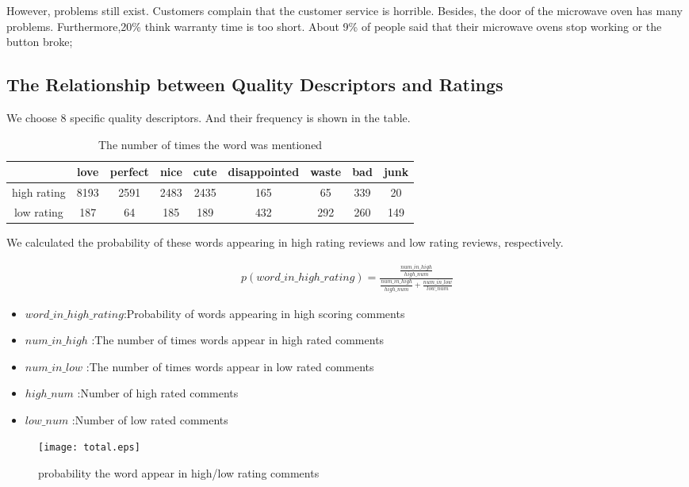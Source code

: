 \documentclass{mcmthesis}
\begin{document}
	However, problems still exist. Customers complain that the customer service is horrible. Besides, the door of the microwave oven has many problems. Furthermore,20\% think warranty time is too short. About 9\% of people said that their microwave ovens stop working or the button broke;
	
	
	
	\subsection{The Relationship between Quality Descriptors and Ratings}
	We choose 8 specific quality descriptors. And their frequency is shown in the table.
	\begin{table}[H]
		\centering
		\caption{The number of times the word was mentioned}
		\begin{tabular}{|c|c|c|c|c|c|c|c|c|}
			\hline 
			& love & perfect & nice & cute & disappointed & waste & bad & junk \\ 
			\hline 
			high rating & 8193 & 2591 & 2483 & 2435 & 165 & 65 & 339 & 20 \\ 
			\hline 
			low rating & 187 & 64 & 185 & 189 & 432 & 292 & 260 & 149 \\ 
			\hline 
		\end{tabular}
	\end{table}
	
	We calculated the probability of these words appearing in high rating reviews and low rating reviews, respectively.
	
	\begin{align}
	p(word\_in\_high\_rating)=\frac{\frac{num\_in\_high}{high\_num}}
	{\frac{num\_in\_high}{high\_num}+\frac{num\_in\_low}{low\_num}}
	\end{align}
	
	\begin{itemize}
		\item  $word\_in\_high\_rating$:Probability of words appearing in high scoring comments 
		\item	$num\_in\_high$ :The number of times words appear in high rated comments
		\item $num\_in\_low$ :The number of times words appear in low rated comments
		\item $high\_num$ :Number of high rated comments
		\item $low\_num$ :Number of low rated comments
	\end{itemize}
	
	
	\begin{figure}[H]
		\begin{minipage}[t]{1\textwidth}
			\centering
			\texttt{[image: total.eps]}
			\caption{probability the word appear in high/low rating comments\label{fig:1}}
		\end{minipage}
	\end{figure}
	
\end{document}
